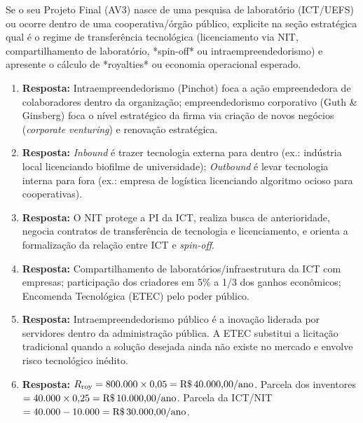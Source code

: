 \begin{boxDica}
  Se o seu Projeto Final (AV3) nasce de uma pesquisa de laboratório (ICT/UEFS) ou ocorre dentro de uma cooperativa/órgão público, explicite na seção estratégica qual é o regime de transferência tecnológica (licenciamento via NIT, compartilhamento de laboratório, *spin-off* ou intraempreendedorismo) e apresente o cálculo de *royalties* ou economia operacional esperado.
\end{boxDica}

\clearpage
{}

\begin{boxGabarito}
  \begin{enumerate}[leftmargin=1.5em, itemsep=4pt]
    \item \textbf{Resposta:} Intraempreendedorismo (Pinchot) foca a ação empreendedora de colaboradores dentro da organização; empreendedorismo corporativo (Guth \& Ginsberg) foca o nível estratégico da firma via criação de novos negócios (\textit{corporate venturing}) e renovação estratégica.
    \item \textbf{Resposta:} \textit{Inbound} é trazer tecnologia externa para dentro (ex.: indústria local licenciando biofilme de universidade); \textit{Outbound} é levar tecnologia interna para fora (ex.: empresa de logística licenciando algoritmo ocioso para cooperativas).
    \item \textbf{Resposta:} O NIT protege a PI da ICT, realiza busca de anterioridade, negocia contratos de transferência de tecnologia e licenciamento, e orienta a formalização da relação entre ICT e \textit{spin-off}.
    \item \textbf{Resposta:} Compartilhamento de laboratórios/infraestrutura da ICT com empresas; participação dos criadores em 5\% a 1/3 dos ganhos econômicos; Encomenda Tecnológica (ETEC) pelo poder público.
    \item \textbf{Resposta:} Intraempreendedorismo público é a inovação liderada por servidores dentro da administração pública. A ETEC substitui a licitação tradicional quando a solução desejada ainda não existe no mercado e envolve risco tecnológico inédito.
    \item \textbf{Resposta:} $R_{\text{roy}} = 800.000 \times 0{,}05 = \text{R\$\,40.000,00/ano}$. Parcela dos inventores $= 40.000 \times 0{,}25 = \text{R\$\,10.000,00/ano}$. Parcela da ICT/NIT $= 40.000 - 10.000 = \text{R\$\,30.000,00/ano}$.

\end{enumerate}
\end{boxGabarito}
